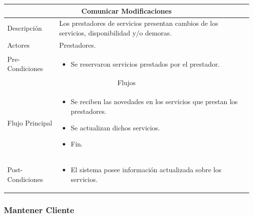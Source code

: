 \documentclass[12pt,a4paper]{article}
\newenvironment{myitemize}
{\begin{itemize}[leftmargin=*,noitemsep,topsep=0pt]}{\end{itemize}}
\newenvironment{caseuse}
{\begin{center}\begin{tabular}{|l|p{10cm}|}}{\end{tabular}\end{center}}
\begin{document}
			\begin{caseuse}
				\hline
				\multicolumn{2}{|c|}{Comunicar Modificaciones} \\ \hline

				Descripción & Los prestadores de servicios presentan cambios de los servicios, disponibilidad y/o demoras. \\ \hline

				Actores & Prestadores. \\ \hline

				Pre-Condiciones & 
					\begin{myitemize}
						\item Se reservaron servicios prestados por el prestador.
					\end{myitemize} \\ \hline

				\multicolumn{2}{|c|}{Flujos} \\ \hline

				Flujo Principal &
					\begin{myitemize}
						\item Se reciben las novedades en los servicios que prestan los prestadores.
						\item Se actualizan dichos servicios.
						\item Fin.
					\end{myitemize} \\ \hline

				Post-Condiciones &
					\begin{myitemize}
						\item El sistema posee información actualizada sobre los servicios.
					\end{myitemize}\\ \hline
			\end{caseuse}


		\subsubsection{Mantener Cliente}
\end{document}
